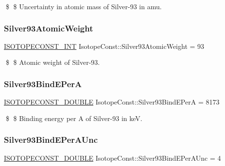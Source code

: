\$ \$ Uncertainty in atomic mass of Silver-\/93 in amu. \mbox{\label{group___isotope_const-_silver-_ag93_ga4c9f5e3e8495a991b6198100da103b2d}} 
\subsubsection{\texorpdfstring{Silver93\+Atomic\+Weight}{Silver93AtomicWeight}}
{\footnotesize\ttfamily \mbox{\hyperlink{group___isotope_const-_macros_ga5f18360b3e99483a35c32d789e62621c}{I\+S\+O\+T\+O\+P\+E\+C\+O\+N\+S\+T\+\_\+\+I\+NT}} Isotope\+Const\+::\+Silver93\+Atomic\+Weight = 93}

\$ \$ Atomic weight of Silver-\/93. \mbox{\label{group___isotope_const-_silver-_ag93_ga24f4826bc7eb833acb0fc855f1fb3e2a}} 
\subsubsection{\texorpdfstring{Silver93\+Bind\+E\+PerA}{Silver93BindEPerA}}
{\footnotesize\ttfamily \mbox{\hyperlink{group___isotope_const-_macros_ga8f45a7272ce02c0b4c65c44636ed719a}{I\+S\+O\+T\+O\+P\+E\+C\+O\+N\+S\+T\+\_\+\+D\+O\+U\+B\+LE}} Isotope\+Const\+::\+Silver93\+Bind\+E\+PerA = 8173}

\$ \$ Binding energy per A of Silver-\/93 in keV. \mbox{\label{group___isotope_const-_silver-_ag93_gabd24eb17419cd163fc571e77ca48e912}} 
\subsubsection{\texorpdfstring{Silver93\+Bind\+E\+Per\+A\+Unc}{Silver93BindEPerAUnc}}
{\footnotesize\ttfamily \mbox{\hyperlink{group___isotope_const-_macros_ga8f45a7272ce02c0b4c65c44636ed719a}{I\+S\+O\+T\+O\+P\+E\+C\+O\+N\+S\+T\+\_\+\+D\+O\+U\+B\+LE}} Isotope\+Const\+::\+Silver93\+Bind\+E\+Per\+A\+Unc = 4}

